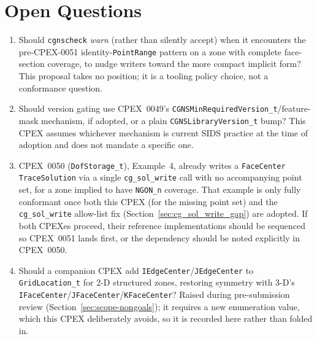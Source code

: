 \documentclass[11pt,letterpaper]{article}
\begin{document}

\section{Open Questions}
\label{sec:open-questions}

\begin{enumerate}[leftmargin=2em]
\item Should \texttt{cgnscheck} \emph{warn} (rather than silently accept)
  when it encounters the pre-CPEX-0051 identity-\texttt{PointRange}
  pattern on a zone with complete face-section coverage, to nudge writers
  toward the more compact implicit form? This proposal takes no position;
  it is a tooling policy choice, not a conformance question.
\item Should version gating use CPEX~0049's
  \texttt{CGNSMinRequiredVersion\_t}/feature-mask mechanism, if adopted,
  or a plain \texttt{CGNSLibraryVersion\_t} bump? This CPEX assumes
  whichever mechanism is current SIDS practice at the time of adoption
  and does not mandate a specific one.
\item \label{item:cpex0050-dependency} CPEX~0050 (\texttt{DofStorage\_t}), Example~4, already writes a
  \texttt{FaceCenter} \texttt{TraceSolution} via a single
  \texttt{cg\_sol\_write} call with no accompanying point set, for a
  zone implied to have \texttt{NGON\_n} coverage. That example is only
  fully conformant once both this CPEX (for the missing point set) and
  the \texttt{cg\_sol\_write} allow-list fix
  (Section~\ref{sec:cg_sol_write_gap}) are adopted. If both CPEXes
  proceed, their reference implementations should be sequenced so
  CPEX~0051 lands first, or the dependency should be noted explicitly in
  CPEX~0050.
\item Should a companion CPEX add \texttt{IEdgeCenter}/\texttt{JEdgeCenter}
  to \texttt{GridLocation\_t} for 2-D structured zones, restoring symmetry
  with 3-D's \texttt{IFaceCenter}/\texttt{JFaceCenter}/\texttt{KFaceCenter}?
  Raised during pre-submission review
  (Section~\ref{sec:scope-nongoals}); it requires a new enumeration
  value, which this CPEX deliberately avoids, so it is recorded here
  rather than folded in.
\end{enumerate}

\end{document}
